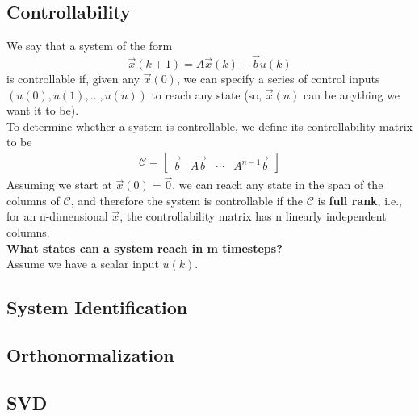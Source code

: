 \subsection*{Controllability}
We say that a system of the form
$$\vec{x}(k + 1) = A\vec{x}(k) + \vec{b} u(k)$$
is controllable if, given any $\vec{x}(0)$, we can specify a series of control inputs $(u(0), u(1), \dots, u(n))$ to reach any state (so, $\vec{x}(n)$ can be anything we want it to be). \\
To determine whether a system is controllable, we define its controllability matrix to be
\begin{align*}
    \mathcal{C} = \begin{bmatrix}
        \vec{b} & A\vec{b} & \cdots & A^{n - 1} \vec{b}
    \end{bmatrix}
\end{align*}
Assuming we start at $\vec{x}(0) = \vec{0}$, we can reach any state in the span of the columns of $\mathcal{C}$, and therefore the system is controllable if the $\mathcal{C}$ is \textbf{full rank}, i.e., for an n-dimensional $\vec{x}$, the controllability matrix has n linearly independent columns. \\
\newline
\textbf{What states can a system reach in m timesteps?} \\
Assume we have a scalar input $u(k)$.  

\subsection*{System Identification}

\subsection*{Orthonormalization}

\subsection*{SVD}
